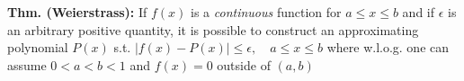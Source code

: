 \textbf{Thm. (Weierstrass):} If \(f(x)\) is a \emph{continuous} function for \(a\leq x \leq b\) and if \(\epsilon\) is an arbitrary positive quantity, it is possible to construct an approximating polynomial \(P(x)\) s.t. \(|f(x)-P(x)| \leq \epsilon,\quad a\leq x \leq b\) where w.l.o.g. one can assume \(0<a<b<1\) and \(f(x)=0\) outside of \((a,b)\)



